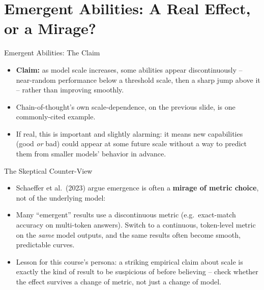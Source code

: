 
\section{Emergent Abilities: A Real Effect, or a Mirage?}

\begin{vbframe}{Emergent Abilities: The Claim}
\begin{itemize}
  \item \textbf{Claim:} as model scale increases, some abilities appear discontinuously -- near-random performance below a threshold scale, then a sharp jump above it -- rather than improving smoothly. 
  \item Chain-of-thought's own scale-dependence, on the previous slide, is one commonly-cited example.
  \item If real, this is important and slightly alarming: it means new capabilities (good \textit{or} bad) could appear at some future scale without a way to predict them from smaller models' behavior in advance.
\end{itemize}
\end{vbframe}

\begin{vbframe}{The Skeptical Counter-View}
\begin{itemize}
  \item Schaeffer et al.\ (2023) argue emergence is often a \textbf{mirage of metric choice}, not of the underlying model: 
  \item Many ``emergent'' results use a discontinuous metric (e.g.\ exact-match accuracy on multi-token answers). Switch to a continuous, token-level metric on the \textit{same} model outputs, and the same results often become smooth, predictable curves.
  \item Lesson for this course's persona: a striking empirical claim about scale is exactly the kind of result to be suspicious of before believing -- check whether the effect survives a change of metric, not just a change of model.
\end{itemize}
\end{vbframe}


